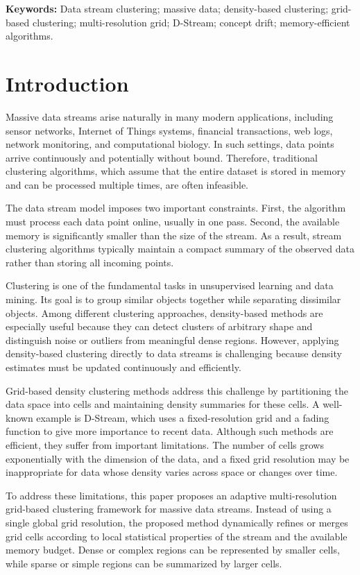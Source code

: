 \documentclass[11pt]{article}
\begin{document}
\noindent \textbf{Keywords:}
Data stream clustering; massive data; density-based clustering; grid-based clustering; multi-resolution grid; D-Stream; concept drift; memory-efficient algorithms.

\section{Introduction}

Massive data streams arise naturally in many modern applications, including sensor networks, Internet of Things systems, financial transactions, web logs, network monitoring, and computational biology. In such settings, data points arrive continuously and potentially without bound. Therefore, traditional clustering algorithms, which assume that the entire dataset is stored in memory and can be processed multiple times, are often infeasible.

The data stream model imposes two important constraints. First, the algorithm must process each data point online, usually in one pass. Second, the available memory is significantly smaller than the size of the stream. As a result, stream clustering algorithms typically maintain a compact summary of the observed data rather than storing all incoming points.

Clustering is one of the fundamental tasks in unsupervised learning and data mining. Its goal is to group similar objects together while separating dissimilar objects. Among different clustering approaches, density-based methods are especially useful because they can detect clusters of arbitrary shape and distinguish noise or outliers from meaningful dense regions. However, applying density-based clustering directly to data streams is challenging because density estimates must be updated continuously and efficiently.

Grid-based density clustering methods address this challenge by partitioning the data space into cells and maintaining density summaries for these cells. A well-known example is D-Stream, which uses a fixed-resolution grid and a fading function to give more importance to recent data. Although such methods are efficient, they suffer from important limitations. The number of cells grows exponentially with the dimension of the data, and a fixed grid resolution may be inappropriate for data whose density varies across space or changes over time.

To address these limitations, this paper proposes an adaptive multi-resolution grid-based clustering framework for massive data streams. Instead of using a single global grid resolution, the proposed method dynamically refines or merges grid cells according to local statistical properties of the stream and the available memory budget. Dense or complex regions can be represented by smaller cells, while sparse or simple regions can be summarized by larger cells.
\end{document}
